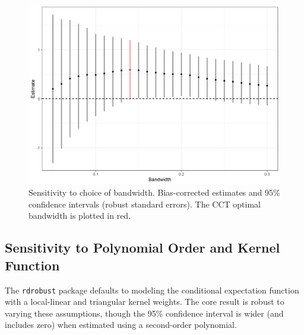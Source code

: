 \documentclass[12pt]{article}
\begin{document}
\begin{appendices}
	
	\begin{figure}[h]
	\centering
	\includegraphics[width=\linewidth]{figures/Figure9.png}
	\caption{Sensitivity to choice of bandwidth. Bias-corrected estimates and 95\% confidence intervals (robust standard errors). The CCT optimal bandwidth is plotted in red.}
	\label{fig:bandwidthSensitivity}
	\end{figure}

	\subsection{Sensitivity to Polynomial Order and Kernel Function}

	The \texttt{rdrobust} package defaults to modeling the conditional expectation function with a local-linear and triangular kernel weights. The core result is robust to varying these assumptions, though the 95\% confidence interval is wider (and includes zero) when estimated using a second-order polynomial.
	 

\end{appendices}
\end{document}

